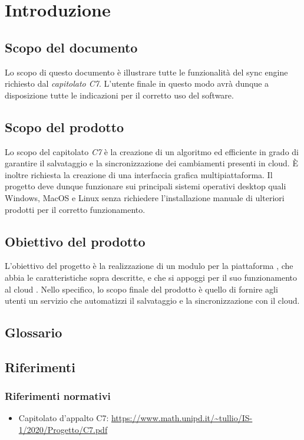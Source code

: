 \section{Introduzione}
\subsection{Scopo del documento}
Lo scopo di questo documento è illustrare tutte le funzionalità del sync engine richiesto dal \textit{capitolato C7}. L'utente finale in questo modo avrà dunque a disposizione tutte le indicazioni per il corretto uso del software.

\subsection{Scopo del prodotto}
Lo scopo del capitolato \textit{C7} è la creazione di un algoritmo  ed efficiente in grado di garantire il salvataggio e la sincronizzazione dei cambiamenti presenti in cloud. È inoltre richiesta la creazione di una interfaccia grafica multipiattaforma. Il progetto deve dunque funzionare sui principali sistemi operativi desktop quali Windows, MacOS e Linux senza richiedere l'installazione manuale di ulteriori prodotti per il corretto funzionamento. 
\subsection{Obiettivo del prodotto}
L'obiettivo del progetto è la realizzazione di un modulo per la piattaforma , che abbia le caratteristiche sopra descritte, e che si appoggi per il suo funzionamento al cloud .
Nello specifico, lo scopo finale del prodotto è quello di fornire agli utenti un servizio che automatizzi il salvataggio e la sincronizzazione con il cloud.

\subsection{Glossario}

\subsection{Riferimenti}
\subsubsection{Riferimenti normativi}
\begin{itemize}
\item Capitolato d'appalto C7: \newline{} \url{https://www.math.unipd.it/~tullio/IS-1/2020/Progetto/C7.pdf}
\end{itemize}

